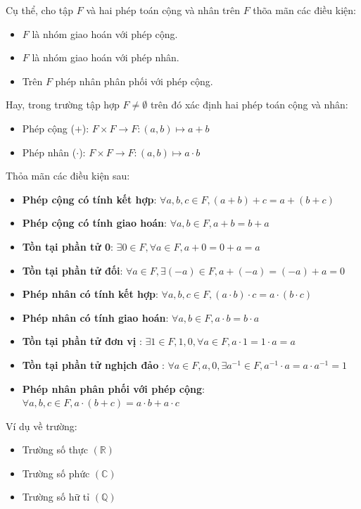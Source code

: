 \documentclass[a4paper,12pt]{report}
\begin{document}
Cụ thể, cho tập $F$ và hai phép toán cộng và nhân trên $F$ thõa mãn các điều kiện:
\begin{itemize}
\item $F$ là nhóm giao hoán với phép cộng.
\item $F$ là nhóm giao hoán với phép nhân.
\item Trên $F$ phép nhân phân phối với phép cộng.
\end{itemize}
Hay, trong trường tập hợp $F \neq \emptyset$ trên đó xác định hai phép toán cộng và nhân:
\begin{itemize}
\item Phép cộng ($+$): $F \times F \rightarrow F: (a,b)\mapsto a + b$
\item Phép nhân ($\cdot$): $F \times F \rightarrow F: (a,b)\mapsto a \cdot b$
\end{itemize}
Thỏa mãn các điều kiện sau:
\begin{itemize}
\item \textbf{Phép cộng có tính kết hợp}: $\forall a, b, c \in F, (a + b) + c = a + (b + c)$
\item \textbf{Phép cộng có tính giao hoán}: $\forall a, b \in F, a + b = b + a$
\item \textbf{Tồn tại phần tử 0}: $\exists 0 \in F, \forall a \in F, a + 0 = 0 + a = a$
\item \textbf{Tồn tại phần tử đối}: $\forall a \in F, \exists (-a) \in F, a + (-a) = (-a) + a = 0$
\item \textbf{Phép nhân có tính kết hợp}: $\forall a, b, c \in F, (a \cdot b) \cdot c = a \cdot (b \cdot c)$
\item \textbf{Phép nhân có tính giao hoán}: $\forall a, b \in F, a \cdot b = b \cdot a$
\item \textbf{Tồn tại phần tử đơn vị }: $\exists 1 \in F, 1 , 0, \forall a \in F, a \cdot 1 = 1 \cdot a = a$
\item \textbf{Tồn tại phần tử nghịch đảo }: $\forall a \in F, a , 0, \exists a^{-1} \in F, a^{-1} \cdot a = a \cdot a^{-1} = 1$
\item \textbf{Phép nhân phân phối với phép cộng}: $\forall a, b, c \in F, a \cdot (b + c) = a \cdot b + a \cdot c$
\end{itemize}
Ví dụ về trường:
\begin{itemize}
\item Trường số thực $(\mathbb{R})$
\item Trường số phức $(\mathbb{C})$
\item Trường số hữ tỉ $(\mathbb{Q})$
\end{itemize}
\end{document}
